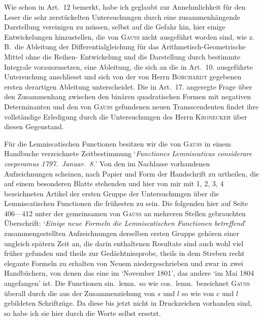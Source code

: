 \documentclass[12pt,a4paper]{article}
\begin{document}
Wie schon in Art.~12 bemerkt, habe ich geglaubt zur Annehmlichkeit f\"ur den Leser die sehr zerst\"uckelten Untersuchungen durch eine zusammenh\"angende Darstellung vereinigen zu m\"ussen, selbst auf die
Gefahr hin, hier einige Entwickelungen hinzustellen, die von \textsc{Gau\ss} nicht ausgef\"uhrt worden sind, wie
z.\,B.\ die Ableitung der Differentialgleichung f\"ur das Arithmetisch-Geometrische Mittel ohne die Reihen-\linebreak
\hspace*{\fill} Entwickelung und die Darstellung durch bestimmte Integrale vorauszusetzen, eine Ableitung, die sich an\linebreak
\hspace*{\fill} die in Art.~10. ausgef\"uhrte Untersuchung anschliesst und sich von der von Herrn \textsc{Borchardt} gegebenen\linebreak
\hspace*{\fill} ersten derartigen Ableitung unterscheidet. Die in Art.~17. angeregte Frage \"uber den Zusammenhang\linebreak
\hspace*{\fill} zwischen den bin\"aren quadratischen Formen mit negativen Determinanten und den von \textsc{Gau\ss} gefundenen\linebreak
\hspace*{\fill} neuen Transscendenten findet ihre vollst\"andige Erledigung durch die Untersuchungen des Herrn \textsc{Kronecker}\linebreak
\hspace*{\fill} \"uber diesen Gegenstand.

F\"ur die Lemniscatischen Functionen besitzen wir die von \textsc{Gau\ss} in einem Handbuche verzeichnete
Zeitbestimmung `\textit{Functiones Lemniscaticas considerare coeperamus 1797.\ Januar.\ 8.}' Von den im Nachlasse vorhandenen Aufzeichnungen scheinen, nach Papier und Form der Handschrift zu urtheilen, die auf
einem besonderen Blatte stehenden und hier von mir mit 1, 2, 3, 4 bezeichneten Artikel der ersten Gruppe
der Untersuchungen \"uber die Lemniscatischen Functionen die fr\"uhesten zu sein. Die folgenden hier auf
Seite 406---412 unter der gemeinsamen von \textsc{Gau\ss} an mehreren Stellen gebrauchten \"Uberschrift:
`\textit{Einige neue Formeln die Lemniscatischen Functionen betreffend}' zusammengestellten Aufzeichnungen derselben ersten Gruppe geh\"oren einer ungleich sp\"atern Zeit an, die darin enthaltenen Resultate sind auch wohl viel fr\"uher gefunden und theils zur Ged\"achtnissprobe, theils in dem Streben recht elegante Formeln zu erhalten von Neuem niedergeschrieben und zwar in zwei Handb\"uchern, von denen das eine im `November 1801', das andere `im Mai 1804 angefangen' ist. Die Functionen sin.\ lemn.\ so wie cos.\ lemn.\ bezeichnet \textsc{Gau\ss} \"uberall durch die aus der Zusammenziehung von $s$ und $l$ so wie von $c$ und $l$ gebildeten Schriftz\"uge. Da diese bis jetzt nicht in Druckzeichen vorhanden sind, so habe ich sie hier durch die Worte selbst ersetzt.
\end{document}
